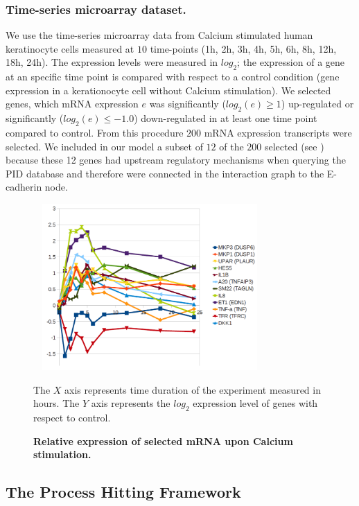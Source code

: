 \subsubsection{Time-series microarray dataset.}
\label{SECTSD}
We use the time-series microarray data from Calcium stimulated human keratinocyte cells 
 measured at $10$ time-points (1h, 2h, 3h, 4h, 5h, 6h, 8h, 12h, 18h, 24h). 
The expression levels were measured in $log_2$; the expression of a gene at an 
specific time point is compared with respect to a control condition (gene expression in a kerationocyte cell without Calcium stimulation).
We selected genes, which mRNA expression $e$ was significantly ($log_2(e) \ge 1$) up-regulated  or 
significantly ($log_2(e) \le -1.0$) down-regulated in at least one time point compared to control.
From this procedure $200$ mRNA expression transcripts were selected. 
We included in our model a subset of $12$ of the $200$ selected (see )
because these 12 genes had upstream regulatory mechanisms when querying the 
PID database and therefore were connected in the interaction graph to the E-cadherin node.

\begin{figure}[H]
\centering
\includegraphics[width=3.5in, height=2.5in]{images/12genes.png}
\caption{\bf Relative expression of selected mRNA upon Calcium stimulation.} The $X$ axis represents time duration of the experiment measured in hours. 
The $Y$ axis represents the $log_{2}$ expression level of genes with respect to control.
\label{fig:tsd}
\end{figure}


\subsection{The Process  Hitting Framework}
\label{ssec:PH}


